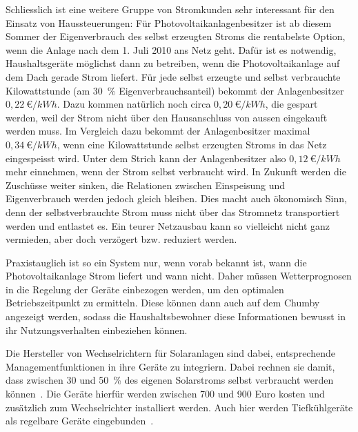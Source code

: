 \documentclass[12pt,BCOR=8.5mm]{scrartcl}
\begin{document}
Schliesslich ist eine weitere Gruppe von Stromkunden sehr interessant
für den Einsatz von Haussteuerungen: Für Photovoltaikanlagenbesitzer ist
ab diesem Sommer der Eigenverbrauch des selbst erzeugten Stroms die
rentabelste Option, wenn die Anlage nach dem 1. Juli 2010 ans Netz geht.
Dafür ist es notwendig, Haushaltsgeräte möglichst dann zu betreiben,
wenn die Photovoltaikanlage auf dem Dach gerade Strom liefert. Für jede
selbst erzeugte und selbst verbrauchte Kilowattstunde (am 30~\%
Eigenverbrauchsanteil) bekommt der Anlagenbesitzer $0,22~{\euro}/{kWh}$.  Dazu
kommen natürlich noch circa $0,20~{\euro}/{kWh}$, die gespart werden, weil der
Strom nicht über den Hausanschluss von aussen eingekauft werden muss. Im
Vergleich dazu bekommt der Anlagenbesitzer maximal $0,34~{\euro}/{kWh}$, wenn
eine Kilowattstunde selbst erzeugten Stroms in das Netz eingespeisst
wird.  Unter dem Strich kann der Anlagenbesitzer also $0,12
~{\euro}/{kWh}$ mehr
einnehmen, wenn der Strom selbst verbraucht wird. In Zukunft werden die
Zuschüsse weiter sinken, die Relationen zwischen Einspeisung und
Eigenverbrauch werden jedoch gleich bleiben. Dies macht auch ökonomisch
Sinn, denn der selbstverbrauchte Strom muss nicht über das Stromnetz
transportiert werden und entlastet es. Ein teurer Netzausbau kann so
vielleicht nicht ganz vermieden, aber doch verzögert bzw.  reduziert
werden.

Praxistauglich ist so ein System nur, wenn vorab bekannt ist, wann die
Photovoltaikanlage Strom liefert und wann nicht. Daher müssen
Wetterprognosen in die Regelung der Geräte einbezogen werden, um den
optimalen Betriebszeitpunkt zu ermitteln. Diese können dann auch auf dem
Chumby angezeigt werden, sodass die Haushaltsbewohner diese
Informationen bewusst in ihr Nutzungsverhalten einbeziehen können.

Die Hersteller von Wechselrichtern für Solaranlagen sind dabei,
entsprechende Managementfunktionen in ihre Geräte zu integriern. Dabei
rechnen sie damit, dass zwischen 30 und 50~\% des eigenen Solarstroms
selbst verbraucht werden können~\cite{ossenbrinck10herstellung}. Die
Geräte hierfür werden zwischen 700 und 900 Euro kosten und zusätzlich
zum Wechselrichter installiert werden. Auch hier werden Tiefkühlgeräte
als regelbare Geräte eingebunden~\cite{ossenbrinck10herstellung}.

%
%
%
%
\end{document}
